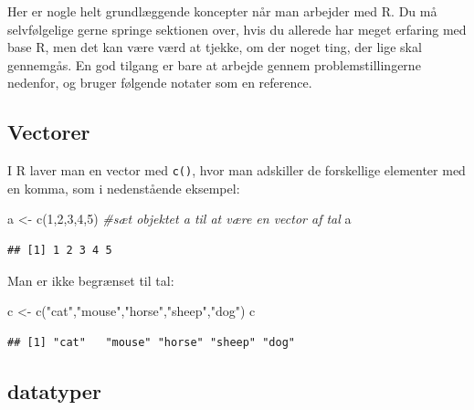 \documentclass[
]{book}
\newenvironment{Shaded}{\begin{snugshade}}{\end{snugshade}}
\newcommand{\CommentTok}[1]{\textcolor[rgb]{0.56,0.35,0.01}{\textit{#1}}}
\newcommand{\DecValTok}[1]{\textcolor[rgb]{0.00,0.00,0.81}{#1}}
\newcommand{\FunctionTok}[1]{\textcolor[rgb]{0.00,0.00,0.00}{#1}}
\newcommand{\NormalTok}[1]{#1}
\newcommand{\OtherTok}[1]{\textcolor[rgb]{0.56,0.35,0.01}{#1}}
\newcommand{\StringTok}[1]{\textcolor[rgb]{0.31,0.60,0.02}{#1}}
\begin{document}
Her er nogle helt grundlæggende koncepter når man arbejder med R. Du må selvfølgelige gerne springe sektionen over, hvis du allerede har meget erfaring med base R, men det kan være værd at tjekke, om der noget ting, der lige skal gennemgås. En god tilgang er bare at arbejde gennem problemstillingerne nedenfor, og bruger følgende notater som en reference.

\hypertarget{vectorer}{%
\subsection{Vectorer}\label{vectorer}}

I R laver man en vector med \texttt{c()}, hvor man adskiller de forskellige elementer med en komma, som i nedenstående eksempel:

\begin{Shaded}
\begin{Highlighting}[]
\NormalTok{a }\OtherTok{\textless{}{-}} \FunctionTok{c}\NormalTok{(}\DecValTok{1}\NormalTok{,}\DecValTok{2}\NormalTok{,}\DecValTok{3}\NormalTok{,}\DecValTok{4}\NormalTok{,}\DecValTok{5}\NormalTok{) }\CommentTok{\#sæt objektet \textquotesingle{}a\textquotesingle{} til at være en vector af tal }
\NormalTok{a}
\end{Highlighting}
\end{Shaded}

\begin{verbatim}
## [1] 1 2 3 4 5
\end{verbatim}

Man er ikke begrænset til tal:

\begin{Shaded}
\begin{Highlighting}[]
\NormalTok{c }\OtherTok{\textless{}{-}} \FunctionTok{c}\NormalTok{(}\StringTok{"cat"}\NormalTok{,}\StringTok{"mouse"}\NormalTok{,}\StringTok{"horse"}\NormalTok{,}\StringTok{"sheep"}\NormalTok{,}\StringTok{"dog"}\NormalTok{)}
\NormalTok{c}
\end{Highlighting}
\end{Shaded}

\begin{verbatim}
## [1] "cat"   "mouse" "horse" "sheep" "dog"
\end{verbatim}

\hypertarget{datatyper}{%
\subsection{datatyper}\label{datatyper}}
\end{document}
